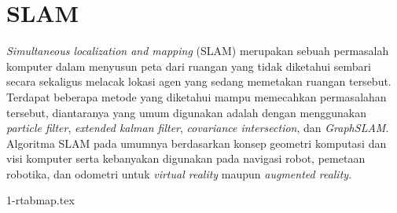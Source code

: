 \section{SLAM}
\label{sec:slam}

\emph{Simultaneous localization and mapping} (SLAM) merupakan sebuah permasalah komputer dalam menyusun peta dari ruangan yang tidak diketahui sembari secara sekaligus melacak lokasi agen yang sedang memetakan ruangan tersebut.
Terdapat beberapa metode yang diketahui mampu memecahkan permasalahan tersebut,
  diantaranya yang umum digunakan adalah dengan menggunakan \emph{particle filter}, \emph{extended kalman filter}, \emph{covariance intersection}, dan \emph{GraphSLAM}.
Algoritma SLAM pada umumnya berdasarkan konsep geometri komputasi dan visi komputer serta kebanyakan digunakan pada navigasi robot,
  pemetaan robotika, dan odometri untuk \emph{virtual reality} maupun \emph{augmented reality}.

{1-rtabmap.tex}
